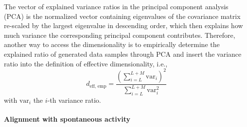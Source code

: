 \documentclass[11pt]{article}
\begin{document}
	The vector of explained variance ratios in the principal component analysis (PCA) is the normalized vector containing eigenvalues of the covariance matrix re-scaled by the largest eigenvalue in descending order, which then explains how much variance the corresponding principal component contributes. Therefore, another way to access the dimensionality is to empirically determine the explained ratio of generated data samples through PCA and insert the variance ratio into the definition of effective dimensionality, i.e.,
		\begin{equation} \label{eq:dim_empirical_sym}
			d_{\text{eff, emp}} = \frac{\left(\sum_{i=L}^{L+M}\text{var}_i\right)^2}{\sum_{i=L}^{L+M}\text{var}_i^2} 
		\end{equation}
	with $\text{var}_i$ the $i$-th variance ratio. 
	
	\paragraph{Alignment with spontaneous activity}
	
\end{document}
